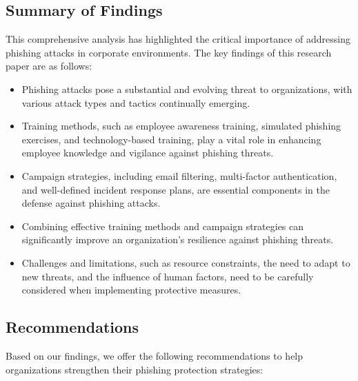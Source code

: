 \documentclass[conference]{IEEEtran}
\begin{document}
\subsection{Summary of Findings}
This comprehensive analysis has highlighted the critical importance of addressing phishing attacks in corporate environments. The key findings of this research paper are as follows:
\begin{itemize}
    \item Phishing attacks pose a substantial and evolving threat to organizations, with various attack types and tactics continually emerging.
\item Training methods, such as employee awareness training, simulated phishing exercises, and technology-based training, play a vital role in enhancing employee knowledge and vigilance against phishing threats.
\item  Campaign strategies, including email filtering, multi-factor authentication, and well-defined incident response plans, are essential components in the defense against phishing attacks.
\item  Combining effective training methods and campaign strategies can significantly improve an organization's resilience against phishing threats.
\item  Challenges and limitations, such as resource constraints, the need to adapt to new threats, and the influence of human factors, need to be carefully considered when implementing protective measures.
\end{itemize}


\subsection{Recommendations}
Based on our findings, we offer the following recommendations to help organizations strengthen their phishing protection strategies:
\end{document}
